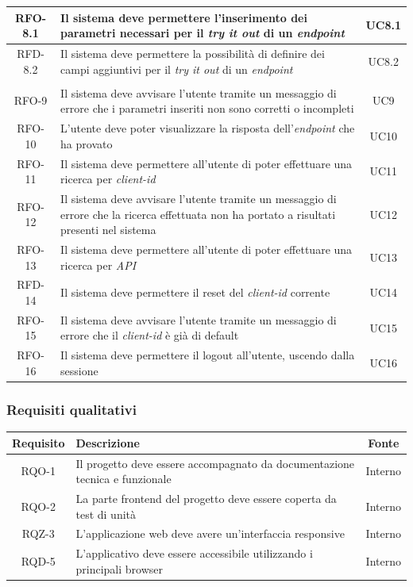 \begin{center}
\begin{longtable}{|c|p{}|c|}
\hline
RFO-8.1 &Il sistema deve permettere l'inserimento dei parametri necessari per il \textit{try it out} di un \textit{endpoint} & UC8.1 \\
\hline
RFD-8.2 &Il sistema deve permettere la possibilità di definire dei campi aggiuntivi per il \textit{try it out} di un \textit{endpoint} & UC8.2 \\
\hline\pagebreak\hline
\multicolumn{3}{|c|}{\textbf{Continuazione della tabella~\ref{tab:requisiti-funzionali}}} \\
\hline
RFO-9 &Il sistema deve avvisare l'utente tramite un messaggio di errore che i parametri inseriti non sono corretti o incompleti & UC9 \\
\hline
RFO-10 &L'utente deve poter visualizzare la risposta dell'\textit{endpoint} che ha provato & UC10 \\
\hline
RFO-11 &Il sistema deve permettere all'utente di poter effettuare una ricerca per \textit{client-id} & UC11 \\
\hline
RFO-12 &Il sistema deve avvisare l'utente tramite un messaggio di errore che la ricerca effettuata non ha portato a risultati presenti nel sistema & UC12 \\
\hline
RFO-13 &Il sistema deve permettere all'utente di poter effettuare una ricerca per \textit{API} & UC13 \\
\hline
RFD-14 &Il sistema deve permettere il reset del \textit{client-id} corrente & UC14 \\
\hline
RFO-15 &Il sistema deve avvisare l'utente tramite un messaggio di errore che il \textit{client-id} è già di default & UC15 \\
\hline
RFO-16 &Il sistema deve permettere il logout all'utente, uscendo dalla sessione  & UC16 \\
\hline
\end{longtable}
\end{center}

\subsubsection{Requisiti qualitativi}

\begin{center}
\label{tab:requisiti-qualitativi}
\begin{longtable}{|c|p{}|c|}
\hline
\textbf{Requisito} & \textbf{Descrizione} & \textbf{Fonte}\\
\hline
RQO-1 &Il progetto deve essere accompagnato da documentazione tecnica e funzionale & Interno \\
\hline
RQO-2 &La parte frontend del progetto deve essere coperta da test di unità & Interno \\
\hline
RQZ-3 &L'applicazione web deve avere un'interfaccia responsive & Interno \\
\hline
RQD-5 &L'applicativo deve essere accessibile utilizzando i principali browser & Interno \\
\hline
\end{longtable}
\end{center}

